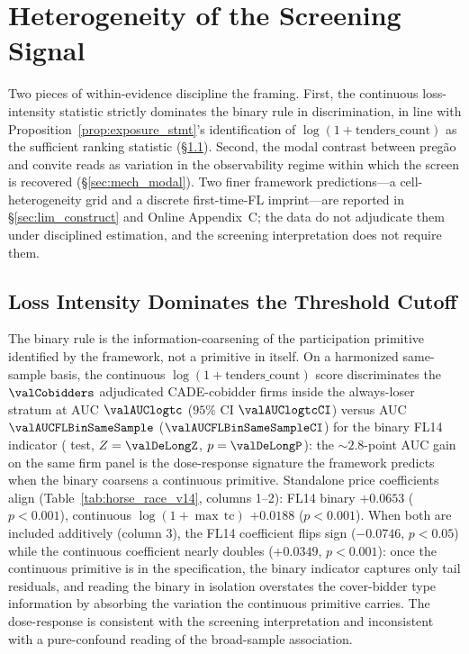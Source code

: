 \section{Heterogeneity of the Screening Signal}
\label{sec:mechanisms}

Two pieces of within-evidence discipline the framing. First, the
continuous loss-intensity statistic strictly dominates the
binary rule in discrimination, in line with
Proposition~\ref{prop:exposure_stmt}'s identification of
$\log(1+\text{tenders\_count})$ as the sufficient ranking
statistic (\S\ref{sec:mech_horse_race}). Second, the modal
contrast between preg\~ao and convite reads as variation in the
observability regime within which the screen is recovered
(\S\ref{sec:mech_modal}). Two finer framework predictions---a
cell-heterogeneity grid and a discrete first-time-FL
imprint---are reported in \S\ref{sec:lim_construct} and Online
Appendix~C; the data do not adjudicate them under disciplined
estimation, and the screening interpretation does not require
them.

\subsection{Loss Intensity Dominates the Threshold Cutoff}
\label{sec:mech_horse_race}

The binary rule is the information-coarsening of the
participation primitive identified by the framework, not a
primitive in itself. On a harmonized same-sample basis, the
continuous $\log(1+\text{tenders\_count})$ score discriminates
the $\valCobidders$ adjudicated CADE-cobidder firms inside the
always-loser stratum at AUC $\valAUClogtc$
($95\%$ CI $\valAUClogtcCI$) versus AUC $\valAUCFLBinSameSample$
($\valAUCFLBinSameSampleCI$) for the binary FL14 indicator
(\citealt{delong1988comparing} test, $Z = \valDeLongZ$,
$p = \valDeLongP$): the $\sim\!2.8$-point AUC gain on the same
firm panel is the dose-response signature the framework predicts
when the binary coarsens a continuous primitive. Standalone price
coefficients align (Table~\ref{tab:horse_race_v14}, columns
1--2): FL14 binary $+0.0653$ ($p<0.001$), continuous
$\log(1+\max\,\text{tc})$ $+0.0188$ ($p<0.001$). When both are
included additively (column 3), the FL14 coefficient flips sign
($-0.0746$, $p<0.05$) while the continuous coefficient nearly
doubles ($+0.0349$, $p<0.001$): once the continuous primitive is
in the specification, the binary indicator captures only tail
residuals, and reading the binary in isolation overstates the
cover-bidder type information by absorbing the variation the
continuous primitive carries. The dose-response is consistent
with the screening interpretation and inconsistent with a
pure-confound reading of the broad-sample association.

